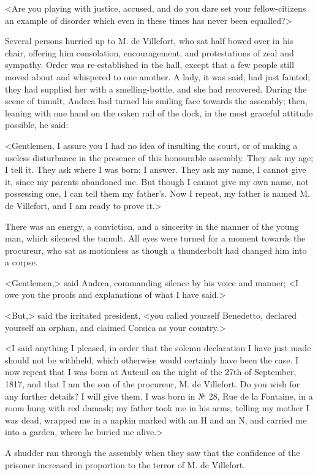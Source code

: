  <Are you playing with justice, accused, and do you dare set your fellow-citizens an example of disorder which even in these times has never been equalled?> 

 Several persons hurried up to M. de Villefort, who sat half bowed over in his chair, offering him consolation, encouragement, and protestations of zeal and sympathy. Order was re-established in the hall, except that a few people still moved about and whispered to one another. A lady, it was said, had just fainted; they had supplied her with a smelling-bottle, and she had recovered. During the scene of tumult, Andrea had turned his smiling face towards the assembly; then, leaning with one hand on the oaken rail of the dock, in the most graceful attitude possible, he said: 

 <Gentlemen, I assure you I had no idea of insulting the court, or of making a useless disturbance in the presence of this honourable assembly. They ask my age; I tell it. They ask where I was born; I answer. They ask my name, I cannot give it, since my parents abandoned me. But though I cannot give my own name, not possessing one, I can tell them my father's. Now I repeat, my father is named M. de Villefort, and I am ready to prove it.> 

 There was an energy, a conviction, and a sincerity in the manner of the young man, which silenced the tumult. All eyes were turned for a moment towards the procureur, who sat as motionless as though a thunderbolt had changed him into a corpse. 

 <Gentlemen,> said Andrea, commanding silence by his voice and manner; <I owe you the proofs and explanations of what I have said.> 

 <But,> said the irritated president, <you called yourself Benedetto, declared yourself an orphan, and claimed Corsica as your country.> 

 <I said anything I pleased, in order that the solemn declaration I have just made should not be withheld, which otherwise would certainly have been the case. I now repeat that I was born at Auteuil on the night of the 27th of September, 1817, and that I am the son of the procureur, M. de Villefort. Do you wish for any further details? I will give them. I was born in № 28, Rue de la Fontaine, in a room hung with red damask; my father took me in his arms, telling my mother I was dead, wrapped me in a napkin marked with an H and an N, and carried me into a garden, where he buried me alive.> 

 A shudder ran through the assembly when they saw that the confidence of the prisoner increased in proportion to the terror of M. de Villefort. 

